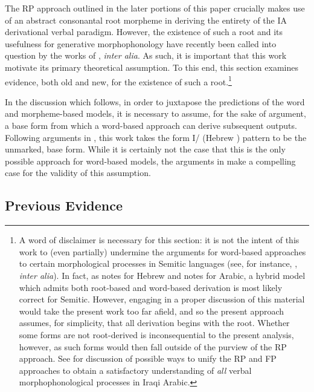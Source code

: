 \documentclass[12pt,twoside,letterpaper]{article}
\begin{document}
The RP approach outlined in the later portions of this paper crucially makes use of an abstract consonantal root morpheme in deriving the entirety of the IA derivational verbal paradigm. However, the existence of such a root and its usefulness for generative morphophonology have recently been called into question by the works of \cite{ussishkin99,ussishkin00,ussishkin05}, \emph{inter alia}. As such, it is important that this work motivate its primary theoretical assumption. To this end, this section examines evidence, both old and new, for the existence of such a root.\footnote{A word of disclaimer is necessary for this section: it is not the intent of this work to (even partially) undermine the arguments for word-based approaches to certain morphological processes in Semitic languages (see, for instance, \cite{batel94,ussishkin99,ussishkin00,batel03,buckley03,ussishkin05}, \emph{inter alia}). In fact, as \cite{arad03,arad05} notes for Hebrew and \cite{tuckerInPrep} notes for Arabic, a hybrid model which admits both root-based and word-based derivation is most likely correct for Semitic. However, engaging in a proper discussion of this material would take the present work too far afield, and so the present approach assumes, for simplicity, that all derivation begins with the root. Whether some forms are not root-derived is inconsequential to the present analysis, however, as such forms would then fall outside of the purview of the RP approach. See \cite{tuckerInPrep} for discussion of possible ways to unify the RP and FP approaches to obtain a satisfactory understanding of \emph{all} verbal morphophonological processes in Iraqi Arabic.}

In the discussion which follows, in order to juxtapose the predictions of the word and morpheme-based models, it is necessary to assume, for the sake of argument, a base form from which a word-based approach can derive subsequent outputs. Following arguments in \cite{ussishkin00}, this work takes the form I/{\em {}} (Hebrew {\em {}}) pattern to be the unmarked, base form. While it is certainly not the case that this is the only possible approach for word-based models, the arguments in \cite{ussishkin00} make a compelling case for the validity of this assumption.

\subsection{Previous Evidence}
\label{sec:prev-publ-evid}
\end{document}

